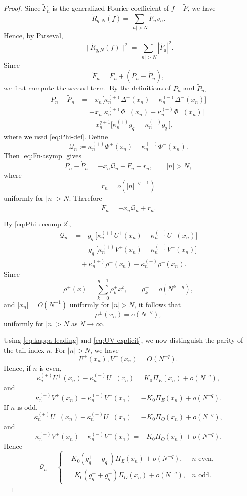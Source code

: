 \documentclass[10pt,a4paper]{amsart}
\begin{document}
\begin{proof} 
Since $\widetilde F_n$ is the generalized Fourier coefficient of
$f-\widetilde P$, we have
\[
\widetilde R_{q,N}(f)
=
\sum_{|n|>N}\widetilde F_n v_n.
\]
Hence, by Parseval,
\[
\|\widetilde R_{q,N}(f)\|^2
=
\sum_{|n|>N}|\widetilde F_n|^2.
\]
Since
\[
\widetilde F_n
=
F_n+(P_n-\widetilde P_n),
\]
we first compute the second term. By the definitions of $P_n$ and
$\widetilde P_n$,
\begin{align*}
P_n-\widetilde P_n
&=
-x_n\bigl[
\kappa_n^{(+)}\Delta^+(x_n)
-\kappa_n^{(-)}\Delta^-(x_n)
\bigr]
\\
&=
-x_n\bigl[
\kappa_n^{(+)}\Phi^+(x_n)
-\kappa_n^{(-)}\Phi^-(x_n)
\bigr]
\\
&\quad
-x_n^{q+1}
\bigl[
\kappa_n^{(+)}g_q^+
-\kappa_n^{(-)}g_q^-
\bigr],
\end{align*}
where we used \eqref{eq:Phi-def}. Define
\[
\mathcal Q_n
:=
\kappa_n^{(+)}\Phi^+(x_n)
-\kappa_n^{(-)}\Phi^-(x_n).
\]
Then \eqref{eq:Fn-asymp} gives
\[
P_n-\widetilde P_n
=
-x_n\mathcal Q_n-F_n+r_{n},
\qquad
|n|>N,
\]
where
\[
r_{n}=o(|n|^{-q-1})
\]
uniformly for $|n|>N$. Therefore
\begin{equation}\label{eq:tildeFn-id}
\widetilde F_n
=
-x_n\mathcal Q_n+r_{n}.
\end{equation}

By \eqref{eq:Phi-decomp-2},
\begin{align*}
\mathcal Q_n
&=
-g_q^+
\bigl[
\kappa_n^{(+)}U^+(x_n)
-\kappa_n^{(-)}U^-(x_n)
\bigr]
\\
&\quad
-g_q^-
\bigl[
\kappa_n^{(+)}V^+(x_n)
-\kappa_n^{(-)}V^-(x_n)
\bigr]
\\
&\quad
+\kappa_n^{(+)}\rho^+(x_n)
-\kappa_n^{(-)}\rho^-(x_n).
\end{align*}
Since
\[
\rho^\pm(x)
=
\sum_{k=0}^{q-1}\rho_k^\pm x^k,
\qquad
\rho_k^\pm=o(N^{k-q}),
\]
and $|x_n|=O(N^{-1})$ uniformly for $|n|>N$, it follows that
\[
\rho^\pm(x_n)=o(N^{-q}),
\]
uniformly for $|n|>N$ as $N\to\infty$.

Using \eqref{eq:kappa-leading} and \eqref{eq:UV-explicit}, we now
distinguish the parity of the tail index $n$. For $|n|>N$, we have
\[
U^\pm(x_n),V^\pm(x_n)=O(N^{-q}).
\]
Hence, if $n$ is even,
\[
\kappa_n^{(+)}U^+(x_n)-\kappa_n^{(-)}U^-(x_n)
=
K_0\Pi_E(x_n)
+
o\!\left(N^{-q}\right),
\]
and
\[
\kappa_n^{(+)}V^+(x_n)-\kappa_n^{(-)}V^-(x_n)
=
-K_0\Pi_E(x_n)
+
o\!\left(N^{-q}\right).
\]
If $n$ is odd,
\[
\kappa_n^{(+)}U^+(x_n)-\kappa_n^{(-)}U^-(x_n)
=
-K_0\Pi_O(x_n)
+
o\!\left(N^{-q}\right),
\]
and
\[
\kappa_n^{(+)}V^+(x_n)-\kappa_n^{(-)}V^-(x_n)
=
-K_0\Pi_O(x_n)
+
o\!\left(N^{-q}\right).
\]
Hence
\begin{equation}\label{eq:Qn-cases}
\mathcal Q_n
=
\begin{cases}
-K_0(g_q^+-g_q^-)\Pi_E(x_n)+o\!\left(N^{-q}\right),
& n\text{ even},
\\[2mm]
\phantom{-}K_0(g_q^++g_q^-)\Pi_O(x_n)+o\!\left(N^{-q}\right),
& n\text{ odd}.
\end{cases}
\end{equation}


\end{proof}
\end{document}
